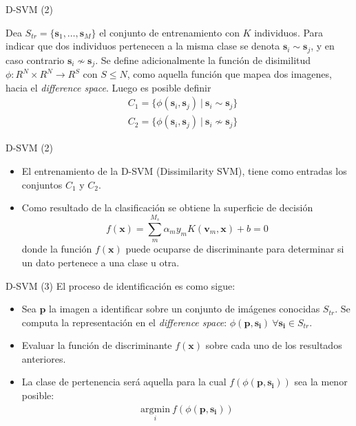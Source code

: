 \documentclass{beamer}
\begin{document}
\begin{frame}{D-SVM (2)}
\begin{definition}
 Dea $S_{tr} = \{\mathbf{s}_1 , \ldots, \mathbf{s}_M \}$ el conjunto de entrenamiento con $K$ individuos. Para indicar que dos individuos pertenecen a la misma clase se denota $\mathbf{s}_i \sim \mathbf{s}_j$, y en caso contrario $\mathbf{s}_i \nsim \mathbf{s}_j$. Se define adicionalmente la función de disimilitud $\phi : R^N \times R^N \rightarrow R^S$ con $S \leq N$, como aquella función que mapea dos imagenes, hacia el \textit{difference space}. Luego es posible definir
\begin{align}
& C_1 = \{\phi(\mathbf{s}_i, \mathbf{s}_j)\  | \ \mathbf{s}_i \sim \mathbf{s}_j \} \\
& C_2 = \{\phi(\mathbf{s}_i, \mathbf{s}_j)\  | \ \mathbf{s}_i \nsim \mathbf{s}_j \}
\end{align}
\end{definition}
\end{frame}

\begin{frame}{D-SVM (2)}
\begin{itemize}
    \item El entrenamiento de la D-SVM (Dissimilarity SVM), tiene como entradas los conjuntos $C_1$ y $C_2$.
    \item Como resultado de la clasificación se obtiene la superficie de decisión
$$
f(\mathbf{x}) = \sum_m^{M_s} \alpha_m y_m K(\mathbf{v}_m, \mathbf{x}) + b = 0
$$
    donde la función $f(\mathbf{x})$ puede ocuparse de discriminante para determinar si un dato pertenece a una clase u otra.
\end{itemize}
\end{frame}
    
\begin{frame}{D-SVM (3)}
    El proceso de identificación es como sigue:
\begin{itemize}
    \item Sea $\mathbf{p}$ la imagen a identificar sobre un conjunto de imágenes conocidas $S_{tr}$. Se computa la
    representación en el \textit{difference space}: $\phi(\mathbf{p},\mathbf{s_i}) \ \forall \mathbf{s_i} \in S_{tr}$.
    \item Evaluar la función de discriminante $f(\mathbf{x})$ sobre cada uno de los resultados anteriores.
    \item La clase de pertenencia será aquella para la cual $f(\phi(\mathbf{p},\mathbf{s_i}))$ sea la menor posible:
    \begin{align}
        \underset{i} {\mathrm{argmin}} ~f(\phi(\mathbf{p},\mathbf{s_i}))
    \end{align}
\end{itemize}
    
\end{frame}
\end{document}
